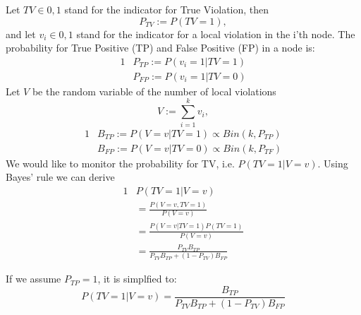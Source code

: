 Let $TV \in {0,1}$ stand for the indicator for True
Violation, then  
\begin{equation*}
P_{TV} := P(TV = 1),
\end{equation*}
and let $v_i \in {0,1}$ stand for the indicator for a local violation in the
i'th node. The probability for True Positive (TP) and False Positive (FP) in a
node is:
\begin{alignat*}{1}
& P_{TP} := P(v_i=1 | TV=1) \\
& P_{FP} := P(v_i=1 | TV=0)
\end{alignat*}
Let $V$ be the random variable of the number of local violations
\begin{equation*}
V := \sum_{i=1}^k v_i,
\end{equation*}
\begin{alignat*}{1}
& B_{TP} := P(V=v | TV=1) \propto Bin(k,P_{TP}) \\
& B_{FP} := P(V=v | TV=0) \propto Bin(k,P_{TF})
\end{alignat*}
We would like to monitor the probability for TV, i.e. $P(TV=1|V=v)$. Using
Bayes' rule we can derive
\begin{alignat*}{1}
& P(TV=1|V=v) \\
& = \frac{P(V=v, TV=1)}{P(V=v)}\\
& = \frac{P(V=v|TV=1)P(TV=1)}{P(V=v)} \\
& = \frac{P_{TV}B_{TP}}{P_{TV}B_{TP} + (1-P_{TV})B_{FP}}
\end{alignat*}

If we assume $P_{TP}=1$, it is simplfied to:
\begin{equation*}
P(TV=1|V=v) = \frac{B_{TP}}{P_{TV}B_{TP} + (1-P_{TV})B_{FP}}
\end{equation*}